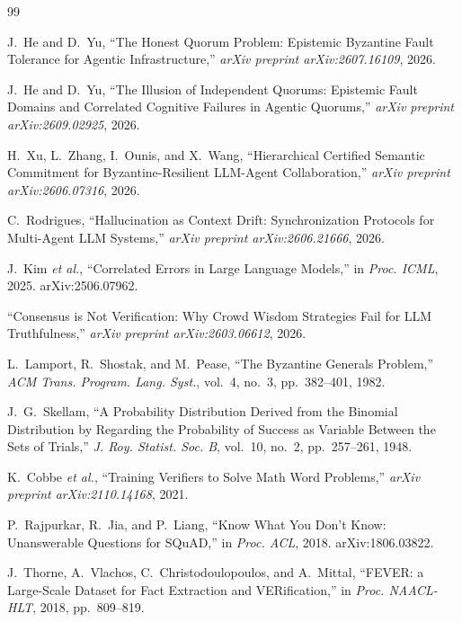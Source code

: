 \documentclass[journal]{IEEEtran}
\begin{document}
\begin{thebibliography}{99}

J.~He and D.~Yu, ``The Honest Quorum Problem: Epistemic Byzantine Fault Tolerance for Agentic Infrastructure,'' \emph{arXiv preprint arXiv:2607.16109}, 2026.

J.~He and D.~Yu, ``The Illusion of Independent Quorums: Epistemic Fault Domains and Correlated Cognitive Failures in Agentic Quorums,'' \emph{arXiv preprint arXiv:2609.02925}, 2026.

H.~Xu, L.~Zhang, I.~Ounis, and X.~Wang, ``Hierarchical Certified Semantic Commitment for Byzantine-Resilient LLM-Agent Collaboration,'' \emph{arXiv preprint arXiv:2606.07316}, 2026.

C.~Rodrigues, ``Hallucination as Context Drift: Synchronization Protocols for Multi-Agent LLM Systems,'' \emph{arXiv preprint arXiv:2606.21666}, 2026.

J.~Kim \emph{et al.}, ``Correlated Errors in Large Language Models,'' in \emph{Proc. ICML}, 2025. arXiv:2506.07962.

``Consensus is Not Verification: Why Crowd Wisdom Strategies Fail for LLM Truthfulness,'' \emph{arXiv preprint arXiv:2603.06612}, 2026.

L.~Lamport, R.~Shostak, and M.~Pease, ``The Byzantine Generals Problem,'' \emph{ACM Trans. Program. Lang. Syst.}, vol.~4, no.~3, pp.~382--401, 1982.

J.~G.~Skellam, ``A Probability Distribution Derived from the Binomial Distribution by Regarding the Probability of Success as Variable Between the Sets of Trials,'' \emph{J. Roy. Statist. Soc. B}, vol.~10, no.~2, pp.~257--261, 1948.

K.~Cobbe \emph{et al.}, ``Training Verifiers to Solve Math Word Problems,'' \emph{arXiv preprint arXiv:2110.14168}, 2021.

P.~Rajpurkar, R.~Jia, and P.~Liang, ``Know What You Don't Know: Unanswerable Questions for SQuAD,'' in \emph{Proc. ACL}, 2018. arXiv:1806.03822.

J.~Thorne, A.~Vlachos, C.~Christodoulopoulos, and A.~Mittal, ``FEVER: a Large-Scale Dataset for Fact Extraction and VERification,'' in \emph{Proc. NAACL-HLT}, 2018, pp.~809--819.

\end{thebibliography}
\end{document}
